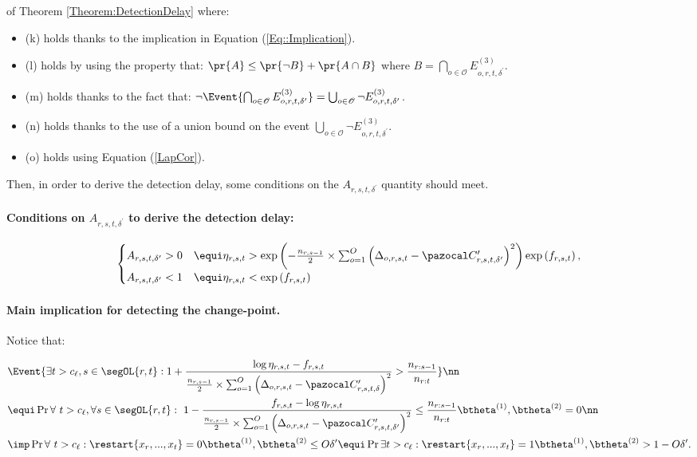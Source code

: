 \documentclass{article} %
\begin{document}
\begin{myproof}{of Theorem \ref{Theorem:DetectionDelay}}
where:
\begin{itemize}
\setlength\itemsep{0.12em}
    \item (k) holds thanks to the implication in Equation (\ref{Eq::Implication}).
    \item (l) holds by using the property that: $\pr{A}\leq \pr{\neg B} + \pr{A \cap B}$ where $B = \bigcap_{o \in \mathcal{O}} E^{(3)}_{o,r,t,\delta^\prime}$.
    \item (m) holds thanks to the fact that: $\neg \Event{ \bigcap_{o \in \mathcal{O}} E^{(3)}_{o,r,t,\delta^\prime}} =  \bigcup_{o \in \mathcal{O}} \neg E^{(3)}_{o,r,t,\delta^\prime}$.
    \item (n) holds thanks to the use of a union bound on the event $ \bigcup_{o \in \mathcal{O}} \neg E^{(3)}_{o,r,t,\delta^\prime}$.
    \item (o) holds using Equation (\ref{LapCor}).
\end{itemize}  

Then, in order to derive the detection delay, some conditions on the $A_{r,s,t, \delta^\prime}$ quantity should meet.

\paragraph{Conditions on $A_{r,s,t, \delta^\prime}$  to derive the detection delay:}
	\begin{align}
	\begin{cases}
	A_{r,s,t, \delta^\prime} > 0 & \equi \eta_{r,s,t} > \exp\left(- \frac{n_{r,s-1}}{2} \times \sum_{o=1}^{O} \left(\Delta_{o,r,s,t} - \pC^\prime_{r,s,t,\delta^\prime}  \right)^2 \right) \exp\left(f_{r,s,t} \right), \label{GammaLwBnd}
	\\
	A_{r,s,t, \delta^\prime} < 1 & \equi 
	\eta_{r,s,t} <  \exp\left( f_{r,s,t} \right)  
	\end{cases}
	\end{align}

\paragraph{Main implication for detecting the change-point.}
Notice that:


\begin{align}
	&\Event{\exists t > c_\ell, s \in \segOL{r,t}:  1+ \frac{\log \eta_{r,s,t} - f_{r,s,t}}{
			\frac{n_{r,s-1}}{2} \times \sum_{o=1}^{O} \left(\Delta_{o,r,s,t} - \pC^\prime_{r,s,t,\delta}  \right)^2} > \frac{n_{r:s-1}}{n_{r:t}} } \nn \\
   &\equi \Pr{\forall\  t > c_\ell , \forall  s \in \segOL{r,t}: \ 
	1- \frac{f_{r,s,t} - \log \eta_{r,s,t}}{
	\frac{n_{r,s-1}}{2} \times \sum_{o=1}^{O} \left(\Delta_{o,r,s,t} - \pC^\prime_{r,s,t,\delta^\prime}  \right)^2} \leq \frac{n_{r:s-1}}{n_{r:t}}}{\btheta^{(1)},\btheta^{(2)}}=0 \nn \\
   & \imp \Pr{ \forall\  t > c_\ell: \restart{x_r,...,x_t} = 0}{\btheta^{(1)},\btheta^{(2)}} \leq O \delta^\prime \equi
	\Pr{\exists t > c_\ell: \restart{x_r,...,x_t} = 1}{\btheta^{(1)},\btheta^{(2)}} > 1- O\delta^\prime. \label{Eq::ChangePointDetection}
	\end{align}		


\end{myproof}
\end{document}
